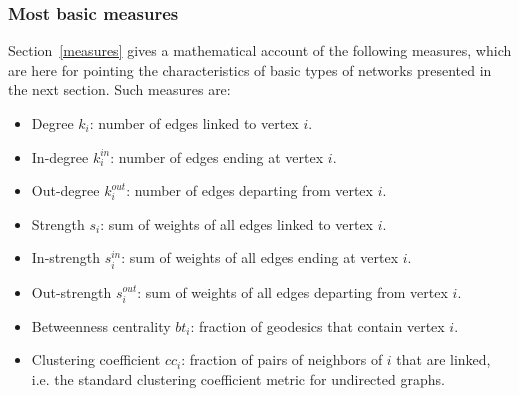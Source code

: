\subsubsection{Most basic measures}
Section~\ref{measures} gives a mathematical account of the following measures,
which are here for pointing the characteristics of basic types
of networks presented in the next section.
Such measures are:
\begin{itemize}
	\item Degree     $k_i$: number of edges linked to vertex $i$.
	\item In-degree  $k_i^{in}$: number of edges ending at vertex $i$.
	\item Out-degree $k_i^{out}$: number of edges departing from vertex $i$.
	\item Strength $s_i$: sum of weights of all edges linked to vertex $i$.
	\item In-strength $s_i^{in}$: sum of weights of all edges ending at vertex $i$.
	\item Out-strength $s_i^{out}$: sum of weights of all edges departing from vertex $i$.
	\item Betweenness centrality $bt_i$: fraction of geodesics that contain vertex $i$.
	\item Clustering coefficient $cc_i$: fraction of pairs of neighbors of $i$ that are linked, i.e. the standard clustering coefficient metric for undirected graphs.
\end{itemize}

